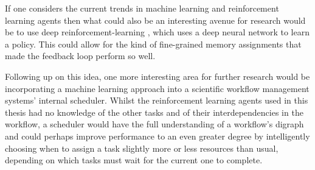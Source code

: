 If one considers the current trends in machine learning and reinforcement learning agents then what could also be an interesting avenue for research would be to use deep reinforcement-learning \cite{deepQ}, which uses a deep neural network to learn a policy. This could allow for the kind of fine-grained memory assignments that made the feedback loop perform so well.

Following up on this idea, one more interesting area for further research would be incorporating a machine learning approach into a scientific workflow management systems’ internal scheduler. Whilst the reinforcement learning agents used in this thesis had no knowledge of the other tasks and of their interdependencies in the workflow, a scheduler would have the full understanding of a workflow’s digraph and could perhaps improve performance to an even greater degree by intelligently choosing when to assign a task slightly more or less resources than usual, depending on which tasks must wait for the current one to complete. 

